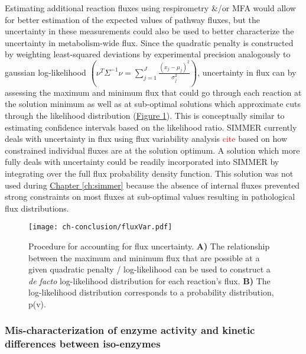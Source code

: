 Estimating additional reaction fluxes using respirometry \&/or MFA would allow for better estimation of the expected values of pathway fluxes, but the uncertainty in these measurements could also be used to better characterize the uncertainty in metabolism-wide flux. Since the quadratic penalty is constructed by weighting least-squared deviations by experimental precision analogously to gaussian log-likelihood $\left(\nu^{T}\Sigma^{-1}\nu = \sum_{j = 1}^{J}\frac{\left(x_{j} - \mu_{j}\right)^2}{\sigma^{2}_j}\right)$, uncertainty in flux can by assessing the maximum and minimum flux that could go through each reaction at the solution minimum as well as at sub-optimal solutions which approximate cuts through the likelihood distribution (\hyperref[conclusion-fluxUncertainty]{Figure \ref{conclusion-fluxUncertainty}}). This is conceptually similar to estimating confidence intervals based on the likelihood ratio. SIMMER currently deals with uncertainty in flux using flux variability analysis \textcolor{red}{cite} based on how constrained individual fluxes are at the solution optimum. A solution which more fully deals with uncertainty could be readily incorporated into SIMMER by integrating over the full flux probability density function.  This solution was not used during \hyperref[ch:simmer]{Chapter \ref{ch:simmer}} because the absence of internal fluxes prevented strong constraints on most fluxes at sub-optimal values resulting in pathological flux distributions. 

\begin{figure}[h!]
\begin{center}
\texttt{[image: ch-conclusion/fluxVar.pdf]}
\caption[Procedure for accounting for flux uncertainty]{Procedure for accounting for flux uncertainty. \textbf{A)} The relationship between the maximum and minimum flux that are possible at a given quadratic penalty / log-likelihood can be used to construct a \textit{de facto} log-likelihood distribution for each reaction's flux. \textbf{B)} The log-likelihood distribution corresponds to a probability distribution, p(v).}
\label{conclusion-fluxUncertainty}
\end{center}
\end{figure}





\subsubsection{Mis-characterization of enzyme activity and kinetic differences between iso-enzymes}

